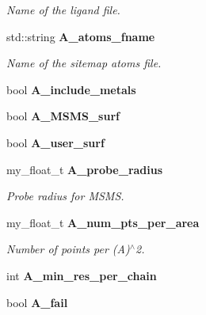 \begin{CompactItemize}
\begin{CompactList}\small\item\em Name of the ligand file. \item\end{CompactList}\item 
std::string \bf{A\_\-atoms\_\-fname}\label{classSimSite3D_1_1Sitemap_22af7b3e2f83f482711f96fd2b8036fb}

\begin{CompactList}\small\item\em Name of the sitemap atoms file. \item\end{CompactList}\item 
bool \textbf{A\_\-include\_\-metals}\label{classSimSite3D_1_1Sitemap_085592f9e6ab4a46b1717d17e15f3590}

\item 
bool \textbf{A\_\-MSMS\_\-surf}\label{classSimSite3D_1_1Sitemap_cc87543764821d5965c02426e3b621c0}

\item 
bool \textbf{A\_\-user\_\-surf}\label{classSimSite3D_1_1Sitemap_8a9754cb39062045c87758860244e132}

\item 
my\_\-float\_\-t \bf{A\_\-probe\_\-radius}\label{classSimSite3D_1_1Sitemap_7474a2670e5f74e20594a2add689f8d5}

\begin{CompactList}\small\item\em Probe radius for MSMS. \item\end{CompactList}\item 
my\_\-float\_\-t \bf{A\_\-num\_\-pts\_\-per\_\-area}\label{classSimSite3D_1_1Sitemap_f9dbc37200a6d1841ea366760f8d0837}

\begin{CompactList}\small\item\em Number of points per (A)$^\wedge$2. \item\end{CompactList}\item 
int \textbf{A\_\-min\_\-res\_\-per\_\-chain}\label{classSimSite3D_1_1Sitemap_ca99b08072b44f7f26cd714417333b44}

\item 
bool \textbf{A\_\-fail}\label{classSimSite3D_1_1Sitemap_960c9c48a78c77be9eae68071e34e987}

\end{CompactItemize}
